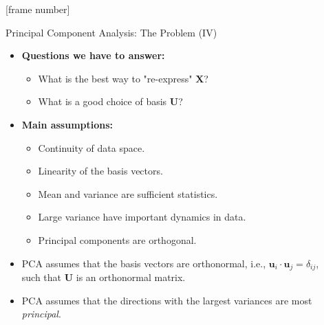 \documentclass[aspectratio=169,t]{beamer}
\begin{document}
  {
    [frame number]
    \begin{frame}{Principal Component Analysis: The Problem (IV)}
    \begin{itemize}
      \item \textbf{Questions we have to answer:}
      \begin{itemize}
        \item What is the best way to "re-express" $\mathbf{X}$?
        \item What is a good choice of basis $\mathbf{U}$?
      \end{itemize}
      \item \textbf{Main assumptions:}
      \begin{itemize}
        \item Continuity of data space.
        \item Linearity of the basis vectors.
        \item Mean and variance are sufficient statistics.
        \item Large variance have important dynamics in data.
        \item Principal components are orthogonal.
      \end{itemize}
      \item PCA assumes that the basis vectors are orthonormal, i.e., $\mathbf{u}_i\cdot\mathbf{u}_j = \delta_{ij}$, \\
      such that $\mathbf{U}$ is an orthonormal matrix.
      \item PCA assumes that the directions with the largest variances are most \emph{principal}.
    \end{itemize}
    \end{frame}
  }
\end{document}

